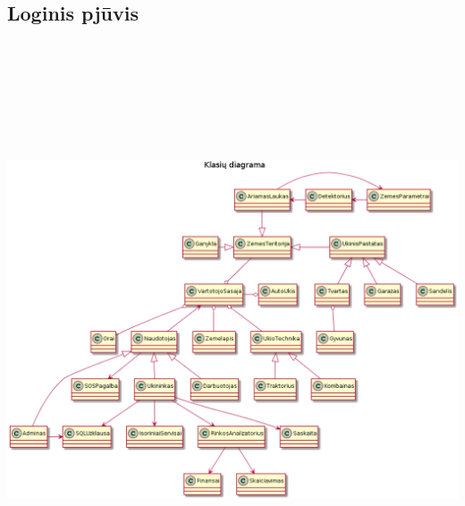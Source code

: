 \documentclass[oneside]{VUMIFPSkursinis}
\begin{document}
\subsection{Loginis pjūvis}
	
	\includegraphics[width=15cm,height=17cm,keepaspectratio]{Klasesv2.png}
\end{document}

